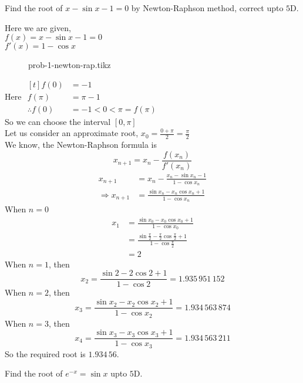 \documentclass[12pt,class=book,crop=false]{standalone}
\begin{document}
\begin{prob}
    Find the root of \( x-\sin x -1=0 \) by Newton-Raphson method, correct upto \( 5 \)D.
\end{prob}
\begin{soln}
    Here we are given,\\
    \indent \( f(x)=x-\sin x-1=0 \)\\
    \indent \( f'(x)=1-\cos x \)\\
    \begin{figure}[H]
        \centering
        {prob-1-newton-rap.tikz}
    \end{figure}
    Here \( \begin{aligned}[t]
        f(0)            & =-1              \\
        f(\pi)          & =\pi -1          \\
        \therefore f(0) & =-1<0<\pi=f(\pi)
    \end{aligned}\)\\
    So we can choose the interval \( [0,\pi] \)\\
    Let us consider an approximate root, \( x_0=\frac{0+\pi}{2}=\frac{\pi}{2} \)\\
    We know, the Newton-Raphson formula is
    \[
        x_{n+1}=x_n-\frac{f(x_n)}{f'(x_n)}
    \]
    \begin{align*}
        x_{n+1}             & =x_n-\frac{x_n-\sin x_n -1}{1-\cos x_n}      \\
        \Rightarrow x_{n+1} & =\frac{\sin x_n- x_n\cos x_n +1}{1-\cos x_n}
    \end{align*}
    When \( n=0 \)
    \begin{align*}
        x_1 & =\frac{\sin x_0- x_0\cos x_0 +1}{1-\cos x_0}                                         \\
            & =\frac{\sin \frac{\pi}{2}- \frac{\pi}{2}\cos \frac{\pi}{2} +1}{1-\cos \frac{\pi}{2}} \\
            & =2
    \end{align*}
    When \( n=1 \), then
    \[
        x_2=\frac{\sin 2- 2\cos 2 +1}{1-\cos 2}=1.935\,951\,152
    \]
    When \( n=2 \), then
    \[
        x_3=\frac{\sin x_2- x_2\cos x_2 +1}{1-\cos x_2}=1.934\,563\,874
    \]
    When \( n=3 \), then
    \[
        x_4=\frac{\sin x_3- x_3\cos x_3 +1}{1-\cos x_3}=1.934\,563\,211
    \]
    So the required root is \( 1.934\,56 \).
\end{soln}
\begin{prob}
    Find the root of \( e^{-x}=\sin x \) upto \( 5 \)D.
\end{prob}
\end{document}
